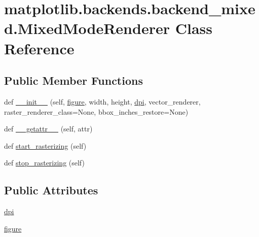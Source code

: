 \hypertarget{classmatplotlib_1_1backends_1_1backend__mixed_1_1MixedModeRenderer}{}\section{matplotlib.\+backends.\+backend\+\_\+mixed.\+Mixed\+Mode\+Renderer Class Reference}
\label{classmatplotlib_1_1backends_1_1backend__mixed_1_1MixedModeRenderer}
\subsection*{Public Member Functions}
\begin{DoxyCompactItemize}
\item 
def \hyperlink{classmatplotlib_1_1backends_1_1backend__mixed_1_1MixedModeRenderer_aed16a9fb82c6af6a79cf669a10e4e2de}{\+\_\+\+\_\+init\+\_\+\+\_\+} (self, \hyperlink{classmatplotlib_1_1backends_1_1backend__mixed_1_1MixedModeRenderer_ac6647cadd116b8c729256db14dfd7be4}{figure}, width, height, \hyperlink{classmatplotlib_1_1backends_1_1backend__mixed_1_1MixedModeRenderer_a8a5f68ab3d5d5f31dadae0dc30bf98f3}{dpi}, vector\+\_\+renderer, raster\+\_\+renderer\+\_\+class=None, bbox\+\_\+inches\+\_\+restore=None)
\item 
def \hyperlink{classmatplotlib_1_1backends_1_1backend__mixed_1_1MixedModeRenderer_ab8f8386aea4876d2828f3f75760ca639}{\+\_\+\+\_\+getattr\+\_\+\+\_\+} (self, attr)
\item 
def \hyperlink{classmatplotlib_1_1backends_1_1backend__mixed_1_1MixedModeRenderer_a2e191760f09e4f0469d44142ab08b787}{start\+\_\+rasterizing} (self)
\item 
def \hyperlink{classmatplotlib_1_1backends_1_1backend__mixed_1_1MixedModeRenderer_a6978009c86bdf37de3dfce251280da31}{stop\+\_\+rasterizing} (self)
\end{DoxyCompactItemize}
\subsection*{Public Attributes}
\begin{DoxyCompactItemize}
\item 
\hyperlink{classmatplotlib_1_1backends_1_1backend__mixed_1_1MixedModeRenderer_a8a5f68ab3d5d5f31dadae0dc30bf98f3}{dpi}
\item 
\hyperlink{classmatplotlib_1_1backends_1_1backend__mixed_1_1MixedModeRenderer_ac6647cadd116b8c729256db14dfd7be4}{figure}
\end{DoxyCompactItemize}


